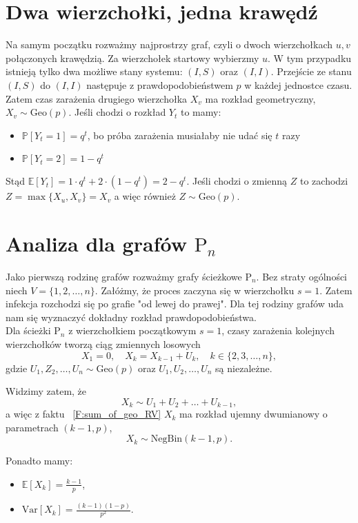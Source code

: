 \section{Dwa wierzchołki, jedna krawędź}

Na samym początku rozważmy najprostrzy graf, czyli o dwoch wierzchołkach $u,v$ połączonych krawędzią. Za wierzchołek startowy wybierzmy $u$. W tym przypadku istnieją tylko dwa możliwe stany systemu: $(I,S)$ oraz $(I,I)$. Przejście ze stanu $(I, S)$ do $(I, I)$ następuje z prawdopodobieństwem $p$ w każdej jednostce czasu. Zatem czas zarażenia drugiego wierzchołka $X_v$ ma rozkład geometryczny, $X_v \sim \mathrm{Geo}(p)$. Jeśli chodzi o rozkład $Y_t$ to mamy:
\begin{itemize}
    \item $\mathbb{P}[Y_t=1]=q^t$, bo próba zarażenia musiałaby nie udać się $t$ razy
    \item $\mathbb{P}[Y_t=2]=1-q^t$
\end{itemize}
Stąd $\mathbb{E}[Y_t]=1\cdot q^t + 2 \cdot (1-q^t) = 2-q^t$. Jeśli chodzi o zmienną $Z$ to zachodzi $Z=\max\{X_u,X_v\}=X_v$ a więc również $Z\sim \mathrm{Geo}(p)$.

\section{Analiza dla grafów $\mathrm{P}_n$}

Jako pierwszą rodzinę grafów rozważmy grafy ścieżkowe $\mathrm{P}_n$. Bez straty ogólności niech $V=\{1,2,\dots,n\}$. Załóżmy, że proces zaczyna się w wierzchołku $s=1$. Zatem infekcja rozchodzi się po grafie "od lewej do prawej". Dla tej rodziny grafów uda nam się wyznaczyć dokładny rozkład prawdopodobieństwa. \\
Dla ścieżki $\mathrm{P}_n$ z wierzchołkiem początkowym $s=1$,  
czasy zarażenia kolejnych wierzchołków tworzą ciąg zmiennych losowych
\[
X_1 = 0, \quad X_{k} = X_{k-1} + U_k, \quad k\in\{2,3,\dots,n\},
\]
gdzie $U_1,Z_2,\dots,U_n \sim \mathrm{Geo}(p)$ oraz $U_1,U_2,\dots,U_n$ są niezależne. 

Widzimy zatem, że
\[
X_k \sim U_1 + U_2 + \dots + U_{k-1},
\]
a więc z faktu ~\ref{F:sum_of_geo_RV} $X_k$ ma rozkład ujemny dwumianowy o parametrach $(k-1, p)$, 
\[
X_k\sim \mathrm{NegBin}(k-1, p).
\]

Ponadto mamy:
\begin{itemize}
    \item $\mathbb{E}[X_k] = \frac{k-1}{p}$,
    \item $\mathrm{Var}[X_k] = \frac{(k-1)(1-p)}{p^2}$.
\end{itemize}

